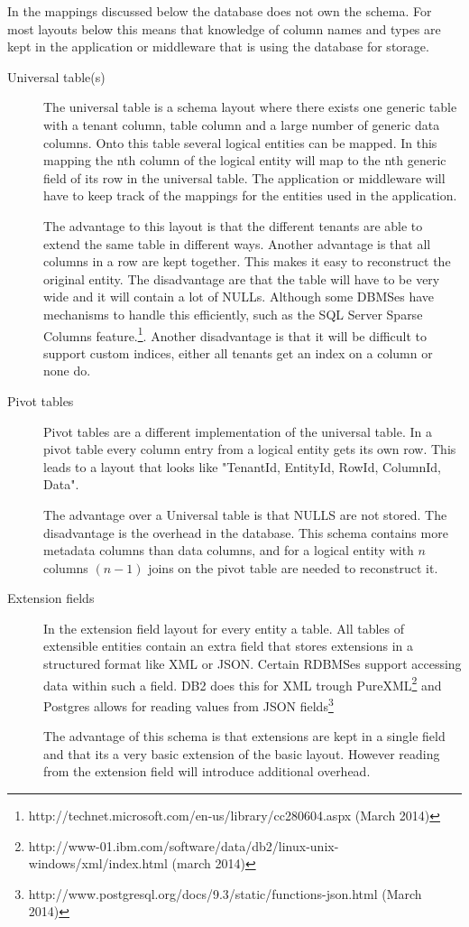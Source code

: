 In the mappings discussed below the database does not own the schema. 
For most layouts below this means that knowledge of column names and types are kept in the application or middleware that is using the database for storage. 
\begin{description}
	\item[Universal table(s)]
		The universal table is a schema layout where there exists one generic table with a tenant column, table column and a large number of generic data columns.
		Onto this table several logical entities can be mapped.
		In this mapping the nth column of the logical entity will map to the nth generic field of its row in the universal table.
		The application or middleware will have to keep track of the mappings for the entities used in the application.

		The advantage to this layout is that the different tenants are able to extend the same table in different ways. 
		Another advantage is that all columns in a row are kept together. 
		This makes it easy to reconstruct the original entity.
		The disadvantage are that the table will have to be very wide and it will contain a lot of NULLs. 
		Although some DBMSes have mechanisms to handle this efficiently, such as the SQL Server Sparse Columns feature.\footnote{http://technet.microsoft.com/en-us/library/cc280604.aspx (March 2014)}.
		Another disadvantage is that it will be difficult to support custom indices, either all tenants get an index on a column or none do.\cite{aulbach2008multi}
	\item[Pivot tables]
		Pivot tables are a different implementation of the universal table.
		In a pivot table every column entry from a logical entity gets its own row. 
		This leads to a layout that looks like "TenantId, EntityId, RowId, ColumnId, Data".

		The advantage over a Universal table is that NULLS are not stored.
		The disadvantage is the overhead in the database. 
		This schema contains more metadata columns than data columns, and for a logical entity with $n$ columns $(n-1)$ joins on the pivot table are needed to reconstruct it.\cite{aulbach2008multi}
	\item[Extension fields]
		In the extension field layout for every entity a table.
		All tables of extensible entities contain an extra field that stores extensions in a structured format like XML or JSON.
		Certain RDBMSes support accessing data within such a field. 
		DB2 does this for XML trough PureXML\footnote{http://www-01.ibm.com/software/data/db2/linux-unix-windows/xml/index.html (march 2014)} and Postgres allows for reading values from JSON fields\footnote{http://www.postgresql.org/docs/9.3/static/functions-json.html (March 2014)}

		The advantage of this schema is that extensions are kept in a single field and that its a very basic extension of the basic layout.
		However reading from the extension field will introduce additional overhead.\cite{aulbach2009comparison}
\end{description}

